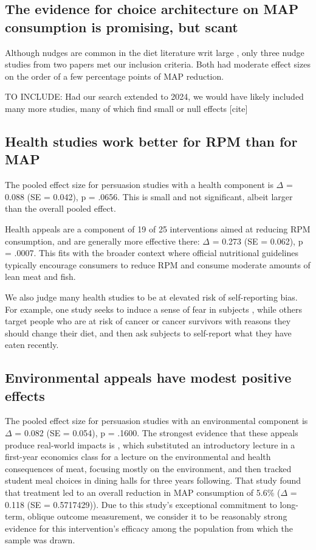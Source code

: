 \documentclass[sn-nature,pdflatex]{sn-jnl}
\begin{document}
\subsection{The evidence for choice architecture on MAP consumption is
promising, but scant}\label{sec2.5}

Although nudges are common in the diet literature writ large
\citep{olafsson2024, cadario2020, szaszi2018}, only three nudge studies
from two papers \citep[@][]{kanchanachitra2020, andersson2021} met our
inclusion criteria. Both had moderate effect sizes on the order of a few
percentage points of MAP reduction.

TO INCLUDE: Had our search extended to 2024, we would have likely
included many more studies, many of which find small or null effects
{[}cite{]}

\subsection{Health studies work better for RPM than for
MAP}\label{sec2.6}

The pooled effect size for persuasion studies with a health component is
\(\Delta\) = 0.088 (SE = 0.042), p = .0656. This is small and not
significant, albeit larger than the overall pooled effect.

Health appeals are a component of 19 of 25 interventions aimed at
reducing RPM consumption, and are generally more effective there:
\(\Delta\) = 0.273 (SE = 0.062), p = .0007. This fits with the broader
context where official nutritional guidelines typically encourage
consumers to reduce RPM and consume moderate amounts of lean meat and
fish.

We also judge many health studies to be at elevated risk of
self-reporting bias. For example, one study seeks to induce a sense of
fear in subjects \citep{berndsen2005}, while others target people who
are at risk of cancer \citep{hatami2018} or cancer survivors
\citep{james2015, lee2018} with reasons they should change their diet,
and then ask subjects to self-report what they have eaten recently.

\subsection{Environmental appeals have modest positive
effects}\label{sec2.7}

The pooled effect size for persuasion studies with an environmental
component is \(\Delta\) = 0.082 (SE = 0.054), p = .1600. The strongest
evidence that these appeals produce real-world impacts is
\citep{jalil2023}, which substituted an introductory lecture in a
first-year economics class for a lecture on the environmental and health
consequences of meat, focusing mostly on the environment, and then
tracked student meal choices in dining halls for three years following.
That study found that treatment led to an overall reduction in MAP
consumption of 5.6\% (\(\Delta\) = 0.118 (SE = 0.5717429)). Due to this
study's exceptional commitment to long-term, oblique outcome
measurement, we consider it to be reasonably strong evidence for this
intervention's efficacy among the population from which the sample was
drawn.
\end{document}
